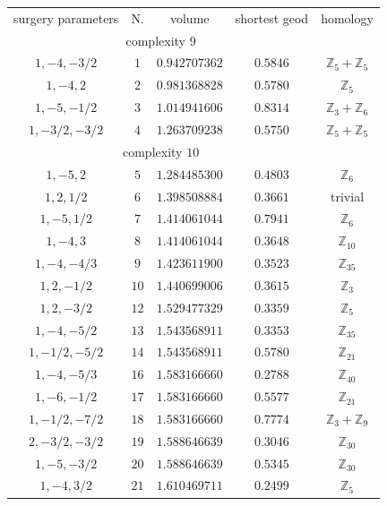\documentclass[10pt]{article}      %
\newcommand{\matZ} {\ensuremath {\mathbb{Z}}}
\begin{document}
\begin{table}
  \begin{center}
    \begin{tabular}{ccccc}
      surgery parameters & N. & volume & shortest geod & homology \\
      \multicolumn{4}{c}{complexity $9$\phantom{\Big|}} \\	
      $1,-4,-3/2$     & $1$  & $0.942707362$ & $0.5846$ & $\matZ_5 + \matZ_5$ \\ 
      $1,-4,2$        & $2$  & $0.981368828$ & $0.5780$ & $\matZ_5$ \\ 
      $1,-5,-1/2$     & $3$  & $1.014941606$ & $0.8314$ & $\matZ_3 + \matZ_6$ \\ 
      $1,-3/2,-3/2$   & $4$  & $1.263709238$ & $0.5750$ & $\matZ_5 + \matZ_5$ \\
      \multicolumn{4}{c}{complexity $10$\phantom{\Big|}} \\	
      $1,-5,2$        & $5$  & $1.284485300$ & $0.4803$ & $\matZ_6$ \\
      $1,2,1/2$       & $6$  & $1.398508884$ & $0.3661$ & trivial \\
      $1,-5,1/2$      & $7$  & $1.414061044$ & $0.7941$ & $\matZ_6$ \\
      $1,-4,3$        & $8$  & $1.414061044$ & $0.3648$ & $\matZ_{10}$ \\
      $1,-4,-4/3$     & $9$  & $1.423611900$ & $0.3523$ & $\matZ_{35}$ \\
      $1,2,-1/2$      & $10$ & $1.440699006$ & $0.3615$ & $\matZ_3$ \\
      $1,2,-3/2$      & $12$ & $1.529477329$ & $0.3359$ & $\matZ_5$ \\
      $1,-4,-5/2$     & $13$ & $1.543568911$ & $0.3353$ & $\matZ_{35}$ \\
      $1,-1/2,-5/2$   & $14$ & $1.543568911$ & $0.5780$ & $\matZ_{21}$ \\
      $1,-4,-5/3$     & $16$ & $1.583166660$ & $0.2788$ & $\matZ_{40}$ \\
      $1,-6,-1/2$     & $17$ & $1.583166660$ & $0.5577$ & $\matZ_{21}$ \\
      $1, -1/2, -7/2$ & $18$ & $1.583166660$ & $0.7774$ & $\matZ_3 + \matZ_9$ \\
      $2,-3/2,-3/2$   & $19$ & $1.588646639$ & $0.3046$ & $\matZ_{30}$ \\
      $1,-5,-3/2$     & $20$ & $1.588646639$ & $0.5345$ & $\matZ_{30}$ \\
      $1,-4,3/2$      & $21$ & $1.610469711$ & $0.2499$ & $\matZ_5$ \\

\end{tabular}
\end{center}
\end{table}
\end{document}
